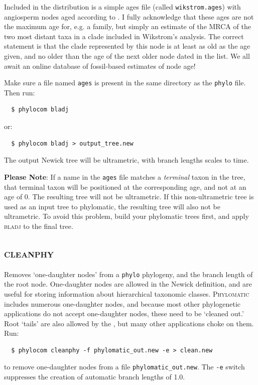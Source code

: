 \documentclass[12pt,letterpaper]{article}
\begin{document}
Included in the distribution is a simple ages file (called
\verb|wikstrom.ages|) with angiosperm nodes aged according to
\citet{wikstrom2001evo}. I fully acknowledge that these ages are not
the maximum age for, e.g. a family, but simply an estimate of the MRCA
of the two most distant taxa in a clade included in Wikstrom's
analysis. The correct statement is that the clade represented by this
node is at least as old as the age given, and no older than the age of
the next older node dated in the list. We all await an online database
of fossil-based estimates of node age!

Make sure a file named \verb|ages| is present in the same directory as the
\verb|phylo| file. Then run:
\begin{verbatim}
  $ phylocom bladj
\end{verbatim}
or:
\begin{verbatim}
  $ phylocom bladj > output_tree.new
\end{verbatim}
The output Newick tree will be ultrametric, with branch lengths scales
to time.

{\bf Please Note}: If a name in the \texttt{ages} file matches a {\it
  terminal} taxon in the tree, that terminal taxon will be positioned
at the corresponding age, and not at an age of 0.  The resulting tree
will not be ultrametric.  If this non-ultrametric tree is used as an
input tree to phylomatic, the resulting tree will also not be
ultrametric.  To avoid this problem, build your phylomatic trees
first, and apply {\scshape bladj} to the final tree.

\subsection{\scshape cleanphy}

Removes `one-daughter nodes' from a \verb|phylo| phylogeny, and the
branch length of the root node.  One-daughter nodes are allowed in the
Newick definition, and are useful for storing information about
hierarchical taxonomic classes. {\scshape Phylomatic} includes
numerous one-daughter nodes, and because most other phylogenetic
applications do not accept one-daughter nodes, these need to be
`cleaned out.'  Root `tails' are also allowed by the
,
but many other applications choke on them. Run:
\begin{verbatim}
  $ phylocom cleanphy -f phylomatic_out.new -e > clean.new 
\end{verbatim}
to remove one-daughter nodes from a file
\verb|phylomatic_out.new|. The \verb|-e| switch suppresses the
creation of automatic branch lengths of 1.0. 
\end{document}
